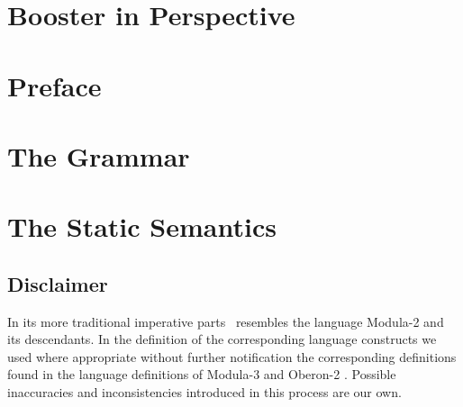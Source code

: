 \documentclass{report}
\begin{document}


\chapter*{Booster in Perspective}

  

\chapter*{Preface}

  

\chapter{The Grammar}\label{BoosterGrammar}

  

\chapter{The Static Semantics}

  
  
  
  

\newpage

\section*{Disclaimer}

In its more traditional imperative parts \Booster\ resembles the
language Modula-2 and its descendants. In the definition of the
corresponding language constructs we used where appropriate without
further notification the corresponding definitions found in the
language definitions of Modula-3 \cite{Nelson91} and Oberon-2
\cite{Mossenbock93}. Possible inaccuracies and inconsistencies
introduced in this process are our own.


\end{document}
